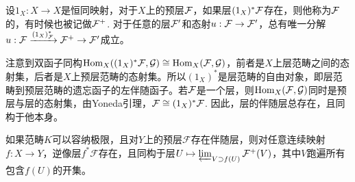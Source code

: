 
\begin{para}[伴随层]
设$1_X:X\to X$是恒同映射，对于$X$上的预层$\mathcal{F}$，如果层$(1_X)^*\mathcal{F}$存在，则他称为$\mathcal{F}$的，有时候也被记做$\mathcal{F}^+$. 对于任意的层$\mathcal{F}'$和态射$u:\mathcal{F}\to\mathcal{F}'$，总有唯一分解$u:\mathcal{F}\xrightarrow{(1_X)^*_{\mathcal{F}}} \mathcal{F}^+ \to \mathcal{F}'$成立。
\end{para}

注意到双函子同构$\operatorname{Hom}_X ((1_X)^* \mathcal{F},\mathcal{G})\cong \operatorname{Hom}_X(\mathcal{F},\mathcal{G})$，前者是$X$上层范畴之间的态射集，后者是$X$上预层范畴的态射集。所以$(1_X)^*$是层范畴的自由对象，即层范畴到预层范畴的遗忘函子的左伴随函子。若$\mathcal{F}$是一个层，则$\operatorname{Hom}_X(\mathcal{F},\mathcal{G})$同时是预层与层的态射集，由Yoneda引理，$\mathcal{F}\cong (1_X)^* \mathcal{F}$. 因此，层的伴随层总存在，且同构于他本身。

\begin{lem}
如果范畴$K$可以容纳极限，且对$Y$上的预层$\mathcal{F}$存在伴随层，则对任意连续映射$f :X\to Y$，逆像层$f^*\mathcal{F}$存在，且同构于层$U\mapsto \varprojlim_{V\supset f(U)} \mathcal{F}^+(V)$，其中$V$跑遍所有包含$f(U)$的开集。
\end{lem}

